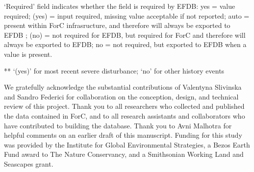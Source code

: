 \documentclass[, manuscript]{copernicus}
\begin{document}
`Required' field indicates whether the field is required by EFDB: yes =
value required; (yes) = input required, missing value acceptable if not
reported; auto = present within ForC infrasructure, and therefore will
always be exported to EFDB ; (no) = not required for EFDB, but required
for ForC and therefore will always be exported to EFDB; no = not
required, but exported to EFDB when a value is present.

** `(yes)' for most recent severe disturbance; `no' for other history
events











\begin{acknowledgements}
We gratefully acknowledge the substantial contributions of Valentyna
Slivinska and Sandro Federici for collaboration on the conception,
design, and technical review of this project. Thank you to all
researchers who collected and published the data contained in ForC, and
to all research assistants and collaborators who have contributed to
building the database. Thank you to Avni Malhotra for helpful comments
on an earlier draft of this manuscript. Funding for this study was
provided by the Institute for Global Environmental Strategies, a Bezos
Earth Fund award to The Nature Conservancy, and a Smithsonian Working
Land and Seascapes grant.
\end{acknowledgements}
\end{document}
